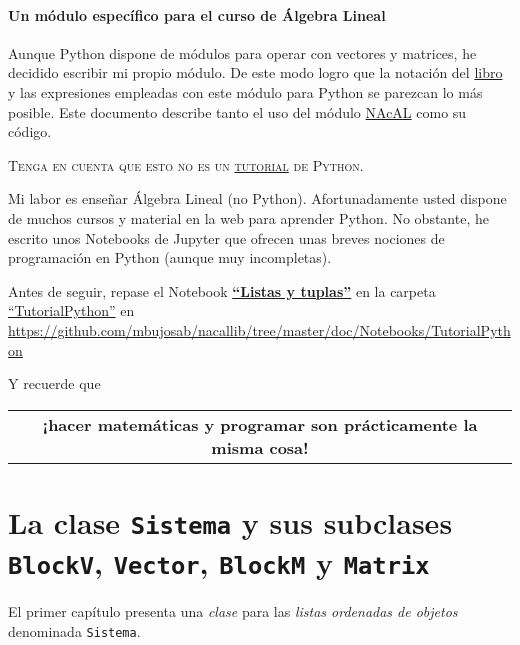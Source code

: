 \documentclass[11pt]{report}
\begin{document}
\subsection*{Un módulo específico para el curso de Álgebra Lineal}
\label{sec:orgec90df3}
Aunque Python dispone de módulos para operar con vectores y matrices, he decidido escribir mi propio
módulo. De este modo logro que la notación del \href{https://github.com/mbujosab/CursoDeAlgebraLineal/blob/master/libro.pdf}{libro} y las expresiones empleadas con este módulo
para Python se parezcan lo más posible. Este documento describe tanto el uso del módulo \href{https://pypi.org/project/nacal/}{NAcAL} como
su código.
\begin{center}
 \textsc{Tenga en cuenta que esto no es un
 \href{https://docs.python.org/es/3/tutorial/index.html}{tutorial} de
 Python}. 
\end{center}
Mi labor es enseñar Álgebra Lineal (no Python). Afortunadamente usted dispone de muchos cursos y
material en la web para aprender Python. No obstante, he escrito unos Notebooks de Jupyter que
ofrecen unas breves nociones de programación en Python (aunque muy incompletas).
\begin{center}
  Antes de seguir, repase el Notebook
  \href{https://mybinder.org/v2/gh/mbujosab/nacallib/master?filepath=doc%2FNotebooks%2FTutorialPython%2F01_ListasYTuplas.ipynb}{\textbf{``Listas y tuplas''}}
    en la carpeta
    \href{https://mybinder.org/v2/gh/mbujosab/nacallib/master?filepath=doc%2FNotebooks%2FTutorialPython%2F}{``TutorialPython''}
    en \url{https://github.com/mbujosab/nacallib/tree/master/doc/Notebooks/TutorialPython}
\end{center}
Y recuerde que 
\begin{center}
\begin{tabular}{c}
\textbf{¡hacer matemáticas y programar son prácticamente la misma cosa!}\\
\end{tabular}
\end{center}


\part{La clase \texttt{Sistema} y sus subclases \texttt{BlockV}, \texttt{Vector}, \texttt{BlockM} y \texttt{Matrix}}
\label{sec:orga987f6d}


El primer capítulo presenta una \emph{clase} para las \emph{listas ordenadas de objetos} denominada \texttt{Sistema}.
\end{document}
